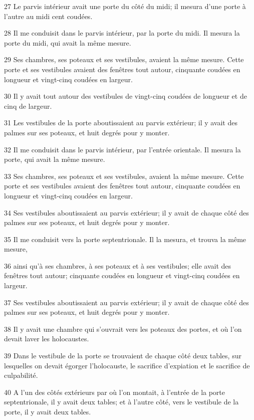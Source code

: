 \par 27 Le parvis intérieur avait une porte du côté du midi; il mesura d'une porte à l'autre au midi cent coudées.
\par 28 Il me conduisit dans le parvis intérieur, par la porte du midi. Il mesura la porte du midi, qui avait la même mesure.
\par 29 Ses chambres, ses poteaux et ses vestibules, avaient la même mesure. Cette porte et ses vestibules avaient des fenêtres tout autour, cinquante coudées en longueur et vingt-cinq coudées en largeur.
\par 30 Il y avait tout autour des vestibules de vingt-cinq coudées de longueur et de cinq de largeur.
\par 31 Les vestibules de la porte aboutissaient au parvis extérieur; il y avait des palmes sur ses poteaux, et huit degrés pour y monter.
\par 32 Il me conduisit dans le parvis intérieur, par l'entrée orientale. Il mesura la porte, qui avait la même mesure.
\par 33 Ses chambres, ses poteaux et ses vestibules, avaient la même mesure. Cette porte et ses vestibules avaient des fenêtres tout autour, cinquante coudées en longueur et vingt-cinq coudées en largeur.
\par 34 Ses vestibules aboutissaient au parvis extérieur; il y avait de chaque côté des palmes sur ses poteaux, et huit degrés pour y monter.
\par 35 Il me conduisit vers la porte septentrionale. Il la mesura, et trouva la même mesure,
\par 36 ainsi qu'à ses chambres, à ses poteaux et à ses vestibules; elle avait des fenêtres tout autour; cinquante coudées en longueur et vingt-cinq coudées en largeur.
\par 37 Ses vestibules aboutissaient au parvis extérieur; il y avait de chaque côté des palmes sur ses poteaux, et huit degrés pour y monter.
\par 38 Il y avait une chambre qui s'ouvrait vers les poteaux des portes, et où l'on devait laver les holocaustes.
\par 39 Dans le vestibule de la porte se trouvaient de chaque côté deux tables, sur lesquelles on devait égorger l'holocauste, le sacrifice d'expiation et le sacrifice de culpabilité.
\par 40 A l'un des côtés extérieurs par où l'on montait, à l'entrée de la porte septentrionale, il y avait deux tables; et à l'autre côté, vers le vestibule de la porte, il y avait deux tables.

